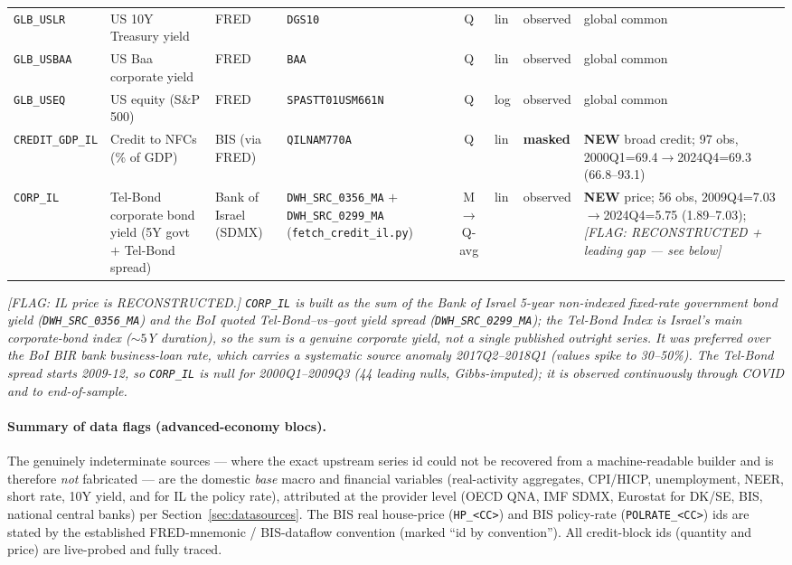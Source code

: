 {\begin{longtable}{@{}lp{2.9cm}p{1.9cm}p{2.0cm}cp{1.4cm}p{1.7cm}p{2.6cm}@{}}
\texttt{GLB\_USLR} & US 10Y Treasury yield & FRED & \texttt{DGS10} & Q & lin & observed & global common\\
\texttt{GLB\_USBAA} & US Baa corporate yield & FRED & \texttt{BAA} & Q & lin & observed & global common\\
\texttt{GLB\_USEQ} & US equity (S\&P 500) & FRED & \texttt{SPASTT01USM661N} & Q & log & observed & global common\\
\texttt{CREDIT\_GDP\_IL} & Credit to NFCs (\% of GDP) & BIS (via FRED) & \texttt{QILNAM770A} & Q & lin & \textbf{masked} & \textbf{NEW} broad credit; 97 obs, 2000Q1=69.4$\to$2024Q4=69.3 (66.8--93.1)\\
\texttt{CORP\_IL} & Tel-Bond corporate bond yield (5Y govt $+$ Tel-Bond spread) & Bank of Israel (SDMX) & \texttt{DWH\_SRC\_0356\_MA} $+$ \texttt{DWH\_SRC\_0299\_MA} (\texttt{fetch\_credit\_il.py}) & M$\to$Q-avg & lin & observed & \textbf{NEW} price; 56 obs, 2009Q4=7.03$\to$2024Q4=5.75 (1.89--7.03); \textit{[FLAG: RECONSTRUCTED + leading gap --- see below]}\\
\end{longtable}}

\noindent\textit{[FLAG: IL price is RECONSTRUCTED.] \texttt{CORP\_IL} is built
as the sum of the Bank of Israel 5-year non-indexed fixed-rate \emph{government}
bond yield (\texttt{DWH\_SRC\_0356\_MA}) and the BoI quoted Tel-Bond--vs--govt
yield spread (\texttt{DWH\_SRC\_0299\_MA}); the Tel-Bond Index is Israel's main
corporate-bond index (${\sim}5$Y duration), so the sum is a genuine corporate
yield, not a single published outright series. It was preferred over the BoI
BIR bank business-loan rate, which carries a systematic source anomaly
2017Q2--2018Q1 (values spike to 30--50\%). The Tel-Bond spread starts 2009-12,
so \texttt{CORP\_IL} is null for 2000Q1--2009Q3 (44 leading nulls, Gibbs-imputed);
it is observed continuously through COVID and to end-of-sample.}

\paragraph{Summary of data flags (advanced-economy blocs).} The genuinely
indeterminate sources --- where the exact upstream series id could not be
recovered from a machine-readable builder and is therefore \emph{not} fabricated
--- are the domestic \emph{base} macro and financial variables (real-activity
aggregates, CPI/HICP, unemployment, NEER, short rate, 10Y yield, and for IL the
policy rate), attributed at the provider level (OECD QNA, IMF SDMX, Eurostat for
DK/SE, BIS, national central banks) per Section~\ref{sec:datasources}. The BIS
real house-price (\texttt{HP\_<CC>}) and BIS policy-rate (\texttt{POLRATE\_<CC>})
ids are stated by the established FRED-mnemonic / BIS-dataflow convention
(marked ``id by convention''). All credit-block ids (quantity and price) are
live-probed and fully traced.

